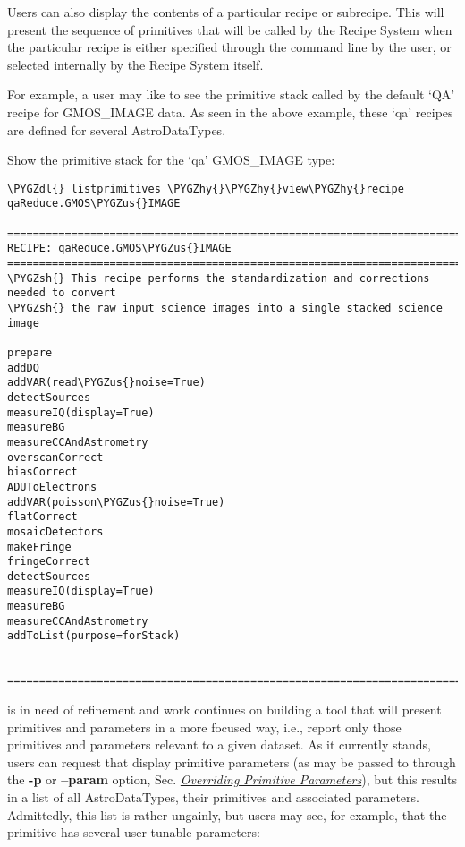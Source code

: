 \documentclass[letterpaper,10pt,english]{sphinxmanual}
\def\PYGZus{\char`\_}
\def\PYGZsh{\char`\#}
\def\PYGZdl{\char`\$}
\def\PYGZhy{\char`\-}
\begin{document}
Users can also display the contents of a particular recipe or subrecipe.
This will present the sequence of primitives that will be called by the
Recipe System when the particular recipe is either specified through the
 command line by the user, or selected internally by the Recipe System
itself.

For example, a user may like to see the primitive stack called by the default
`QA' recipe for GMOS\_IMAGE data. As seen in the above example, these `qa' recipes
are defined for several AstroDataTypes.

Show the primitive stack for the `qa' GMOS\_IMAGE type:

\begin{Verbatim}[commandchars=\\\{\}]
\PYGZdl{} listprimitives \PYGZhy{}\PYGZhy{}view\PYGZhy{}recipe qaReduce.GMOS\PYGZus{}IMAGE

===============================================================================
RECIPE: qaReduce.GMOS\PYGZus{}IMAGE
===============================================================================
\PYGZsh{} This recipe performs the standardization and corrections needed to convert
\PYGZsh{} the raw input science images into a single stacked science image

prepare
addDQ
addVAR(read\PYGZus{}noise=True)
detectSources
measureIQ(display=True)
measureBG
measureCCAndAstrometry
overscanCorrect
biasCorrect
ADUToElectrons
addVAR(poisson\PYGZus{}noise=True)
flatCorrect
mosaicDetectors
makeFringe
fringeCorrect
detectSources
measureIQ(display=True)
measureBG
measureCCAndAstrometry
addToList(purpose=forStack)


===============================================================================
\end{Verbatim}

 is in need of refinement and work continues on
building a tool that will present primitives and parameters in a more focused
way, i.e., report only those primitives and parameters relevant to a given
dataset. As it currently stands, users can request that 
display primitive parameters (as may be passed to  through the
\textbf{-p} or \textbf{--param} option, Sec. {\hyperref[interfaces:userpars]{\emph{Overriding Primitive Parameters}}}), but this results in a
list of all AstroDataTypes, their primitives and associated parameters.
Admittedly, this list is rather ungainly, but users may see, for example, that
the primitive  has several user-tunable parameters:
\end{document}
